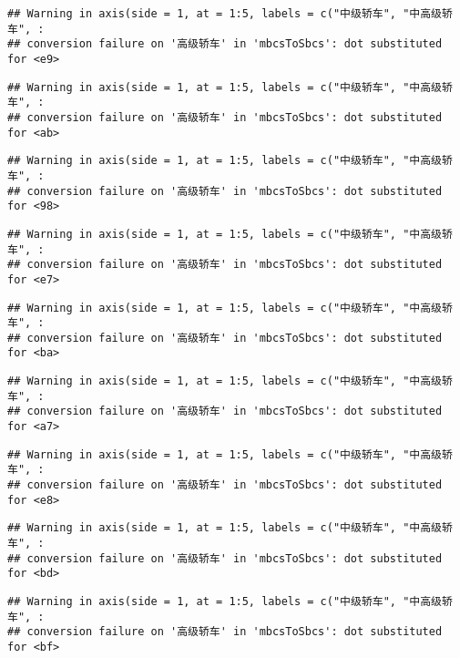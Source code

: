 \documentclass[]{article}
\begin{document}
\begin{verbatim}
## Warning in axis(side = 1, at = 1:5, labels = c("中级轿车", "中高级轿车", :
## conversion failure on '高级轿车' in 'mbcsToSbcs': dot substituted for <e9>
\end{verbatim}

\begin{verbatim}
## Warning in axis(side = 1, at = 1:5, labels = c("中级轿车", "中高级轿车", :
## conversion failure on '高级轿车' in 'mbcsToSbcs': dot substituted for <ab>
\end{verbatim}

\begin{verbatim}
## Warning in axis(side = 1, at = 1:5, labels = c("中级轿车", "中高级轿车", :
## conversion failure on '高级轿车' in 'mbcsToSbcs': dot substituted for <98>
\end{verbatim}

\begin{verbatim}
## Warning in axis(side = 1, at = 1:5, labels = c("中级轿车", "中高级轿车", :
## conversion failure on '高级轿车' in 'mbcsToSbcs': dot substituted for <e7>
\end{verbatim}

\begin{verbatim}
## Warning in axis(side = 1, at = 1:5, labels = c("中级轿车", "中高级轿车", :
## conversion failure on '高级轿车' in 'mbcsToSbcs': dot substituted for <ba>
\end{verbatim}

\begin{verbatim}
## Warning in axis(side = 1, at = 1:5, labels = c("中级轿车", "中高级轿车", :
## conversion failure on '高级轿车' in 'mbcsToSbcs': dot substituted for <a7>
\end{verbatim}

\begin{verbatim}
## Warning in axis(side = 1, at = 1:5, labels = c("中级轿车", "中高级轿车", :
## conversion failure on '高级轿车' in 'mbcsToSbcs': dot substituted for <e8>
\end{verbatim}

\begin{verbatim}
## Warning in axis(side = 1, at = 1:5, labels = c("中级轿车", "中高级轿车", :
## conversion failure on '高级轿车' in 'mbcsToSbcs': dot substituted for <bd>
\end{verbatim}

\begin{verbatim}
## Warning in axis(side = 1, at = 1:5, labels = c("中级轿车", "中高级轿车", :
## conversion failure on '高级轿车' in 'mbcsToSbcs': dot substituted for <bf>
\end{verbatim}
\end{document}
